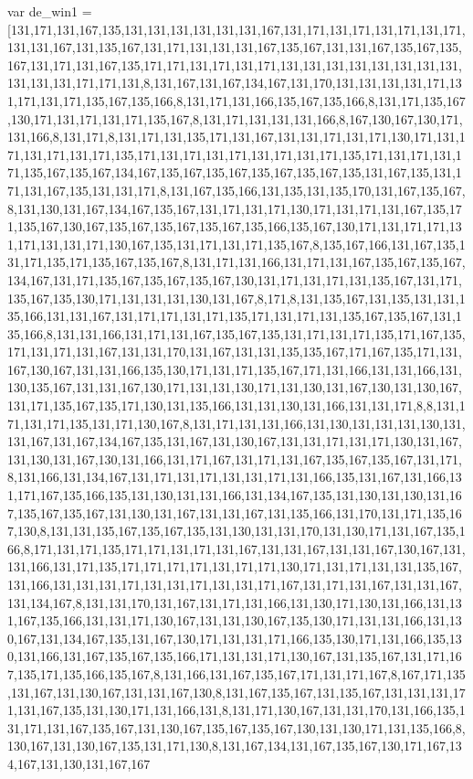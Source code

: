 var de_win1 = [131,171,131,167,135,131,131,131,131,131,131,167,131,171,131,171,131,171,131,171,131,131,167,131,135,167,131,171,131,131,131,167,135,167,131,131,167,135,167,135,167,131,171,131,167,135,171,171,131,171,131,171,131,131,131,131,131,131,131,131,131,131,131,171,171,131,8,131,167,131,167,134,167,131,170,131,131,131,131,171,131,171,131,171,135,167,135,166,8,131,171,131,166,135,167,135,166,8,131,171,135,167,130,171,131,171,131,171,135,167,8,131,171,131,131,131,166,8,167,130,167,130,171,131,166,8,131,171,8,131,171,131,135,171,131,167,131,131,171,131,171,130,171,131,171,131,171,131,171,135,171,131,171,131,171,131,171,131,171,135,171,131,171,131,171,135,167,135,167,134,167,135,167,135,167,135,167,135,167,135,131,167,135,131,171,131,167,135,131,131,171,8,131,167,135,166,131,135,131,135,170,131,167,135,167,8,131,130,131,167,134,167,135,167,131,171,131,171,130,171,131,171,131,167,135,171,135,167,130,167,135,167,135,167,135,167,135,166,135,167,130,171,131,171,171,131,171,131,131,171,130,167,135,131,171,131,171,135,167,8,135,167,166,131,167,135,131,171,135,171,135,167,135,167,8,131,171,131,166,131,171,131,167,135,167,135,167,134,167,131,171,135,167,135,167,135,167,130,131,171,131,171,131,135,167,131,171,135,167,135,130,171,131,131,131,130,131,167,8,171,8,131,135,167,131,135,131,131,135,166,131,131,167,131,171,171,131,171,135,171,131,171,131,135,167,135,167,131,135,166,8,131,131,166,131,171,131,167,135,167,135,131,171,131,171,135,171,167,135,171,131,171,131,167,131,131,170,131,167,131,131,135,135,167,171,167,135,171,131,167,130,167,131,131,166,135,130,171,131,171,135,167,171,131,166,131,131,166,131,130,135,167,131,131,167,130,171,131,131,130,171,131,130,131,167,130,131,130,167,131,171,135,167,135,171,130,131,135,166,131,131,130,131,166,131,131,171,8,8,131,171,131,171,135,131,171,130,167,8,131,171,131,131,166,131,130,131,131,131,130,131,131,167,131,167,134,167,135,131,167,131,130,167,131,131,171,131,171,130,131,167,131,130,131,167,130,131,166,131,171,167,131,171,131,167,135,167,135,167,131,171,8,131,166,131,134,167,131,171,131,171,131,131,171,131,166,135,131,167,131,166,131,171,167,135,166,135,131,130,131,131,166,131,134,167,135,131,130,131,130,131,167,135,167,135,167,131,130,131,167,131,131,167,131,135,166,131,170,131,171,135,167,130,8,131,131,135,167,135,167,135,131,130,131,131,170,131,130,171,131,167,135,166,8,171,131,171,135,171,171,131,171,131,167,131,131,167,131,131,167,130,167,131,131,166,131,171,135,171,171,171,171,131,171,171,130,171,131,171,131,131,135,167,131,166,131,131,131,171,131,131,171,131,131,171,167,131,171,131,167,131,131,167,131,134,167,8,131,131,170,131,167,131,171,131,166,131,130,171,130,131,166,131,131,167,135,166,131,131,171,130,167,131,131,130,167,135,130,171,131,131,166,131,130,167,131,134,167,135,131,167,130,171,131,131,171,166,135,130,171,131,166,135,130,131,166,131,167,135,167,135,166,171,131,131,171,130,167,131,135,167,131,171,167,135,171,135,166,135,167,8,131,166,131,167,135,167,171,131,171,167,8,167,171,135,131,167,131,130,167,131,131,167,130,8,131,167,135,167,131,135,167,131,131,131,171,131,167,135,131,130,171,131,166,131,8,131,171,130,167,131,131,170,131,166,135,131,171,131,167,135,167,131,130,167,135,167,135,167,130,131,130,171,131,135,166,8,130,167,131,130,167,135,131,171,130,8,131,167,134,131,167,135,167,130,171,167,134,167,131,130,131,167,167